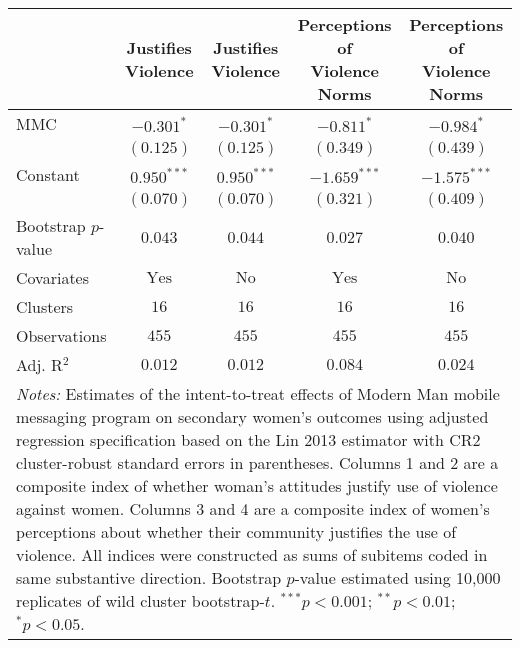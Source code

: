 
\begin{tabular}{l c c c c}
\toprule
 & Justifies Violence & Justifies Violence & \shortstack{Perceptions of \\ Violence Norms} & \shortstack{Perceptions of \\ Violence Norms} \\
\midrule
MMC                 & $-0.301^{*}$   & $-0.301^{*}$  & $-0.811^{*}$   & $-0.984^{*}$   \\
                    & $(0.125)$      & $(0.125)$     & $(0.349)$      & $(0.439)$      \\
Constant            & $0.950^{***}$  & $0.950^{***}$ & $-1.659^{***}$ & $-1.575^{***}$ \\
                    & $(0.070)$      & $(0.070)$     & $(0.321)$      & $(0.409)$      \\
\midrule
Bootstrap $p$-value & $0.043$        & $0.044$       & $0.027$        & $0.040$        \\
Covariates          & $\textrm{Yes}$ & $\textrm{No}$ & $\textrm{Yes}$ & $\textrm{No}$  \\
Clusters            & $16$           & $16$          & $16$           & $16$           \\
Observations        & $455$          & $455$         & $455$          & $455$          \\
Adj. R$^2$          & $0.012$        & $0.012$       & $0.084$        & $0.024$        \\
\bottomrule
\multicolumn{5}{l}{\scriptsize{\parbox{\linewidth}{\vspace{2pt}
       \textit{Notes:} Estimates of the intent-to-treat effects of Modern Man mobile
       messaging program on secondary women's outcomes using adjusted regression
       specification based on the Lin 2013 estimator with CR2 cluster-robust
       standard errors in parentheses. Columns 1 and 2 are a composite index of
       whether woman's attitudes justify use of violence against women. Columns 3 and 4
       are a composite index of women's perceptions about whether their community justifies
       the use of violence. All indices were constructed as sums of subitems coded in
       same substantive direction. Bootstrap $p$-value estimated using 10,000 replicates of wild cluster bootstrap-$t$.\\ $^{***}p<0.001$; $^{**}p<0.01$; $^{*}p<0.05$.}}}
\end{tabular}

